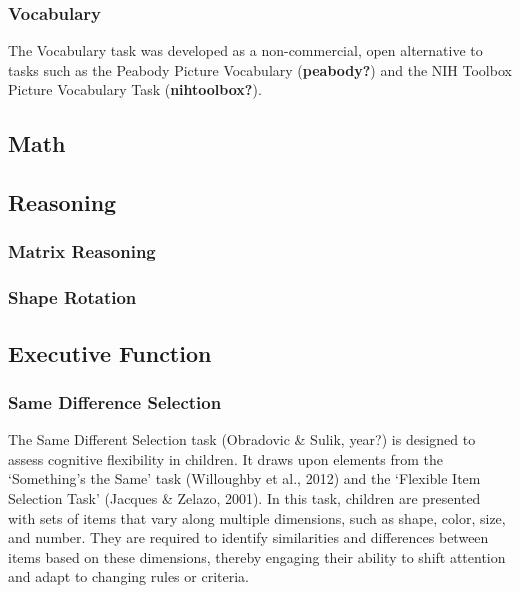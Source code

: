 \documentclass[
  english,
  man]{apa6}
\begin{document}
\subsubsection{Vocabulary}\label{vocabulary}

The Vocabulary task was developed as a non-commercial, open alternative to tasks such as the Peabody Picture Vocabulary (\textbf{peabody?}) and the NIH Toolbox Picture Vocabulary Task (\textbf{nihtoolbox?}).

\subsection{Math}\label{math}

\subsection{Reasoning}\label{reasoning}

\subsubsection{Matrix Reasoning}\label{matrix-reasoning}

\subsubsection{Shape Rotation}\label{shape-rotation}

\subsection{Executive Function}\label{executive-function}

\subsubsection{Same Difference Selection}\label{same-difference-selection}

The Same Different Selection task (Obradovi\textquotesingle c \& Sulik, year?) is designed to assess cognitive flexibility in children. It draws upon elements from the `Something's the Same' task (Willoughby et al., 2012) and the `Flexible Item Selection Task' (Jacques \& Zelazo, 2001). In this task, children are presented with sets of items that vary along multiple dimensions, such as shape, color, size, and number. They are required to identify similarities and differences between items based on these dimensions, thereby engaging their ability to shift attention and adapt to changing rules or criteria.
\end{document}
